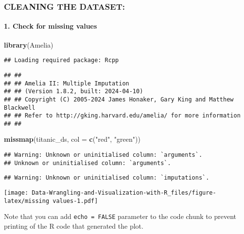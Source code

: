\documentclass[
]{article}
\newenvironment{Shaded}{\begin{snugshade}}{\end{snugshade}}
\newcommand{\AttributeTok}[1]{\textcolor[rgb]{0.13,0.29,0.53}{#1}}
\newcommand{\FunctionTok}[1]{\textcolor[rgb]{0.13,0.29,0.53}{\textbf{#1}}}
\newcommand{\NormalTok}[1]{#1}
\newcommand{\StringTok}[1]{\textcolor[rgb]{0.31,0.60,0.02}{#1}}
\begin{document}
\subsubsection{CLEANING THE DATASET:}\label{cleaning-the-dataset}

\paragraph{1. Check for missing values}\label{check-for-missing-values}

\begin{Shaded}
\begin{Highlighting}[]
\FunctionTok{library}\NormalTok{(Amelia)}
\end{Highlighting}
\end{Shaded}

\begin{verbatim}
## Loading required package: Rcpp
\end{verbatim}

\begin{verbatim}
## ## 
## ## Amelia II: Multiple Imputation
## ## (Version 1.8.2, built: 2024-04-10)
## ## Copyright (C) 2005-2024 James Honaker, Gary King and Matthew Blackwell
## ## Refer to http://gking.harvard.edu/amelia/ for more information
## ##
\end{verbatim}

\begin{Shaded}
\begin{Highlighting}[]
\FunctionTok{missmap}\NormalTok{(titanic\_ds, }\AttributeTok{col =} \FunctionTok{c}\NormalTok{(}\StringTok{"red"}\NormalTok{, }\StringTok{"green"}\NormalTok{))}
\end{Highlighting}
\end{Shaded}

\begin{verbatim}
## Warning: Unknown or uninitialised column: `arguments`.
## Unknown or uninitialised column: `arguments`.
\end{verbatim}

\begin{verbatim}
## Warning: Unknown or uninitialised column: `imputations`.
\end{verbatim}

\texttt{[image: Data-Wrangling-and-Visualization-with-R\_files/figure-latex/missing values-1.pdf]}

Note that you can add \texttt{echo\ =\ FALSE} parameter to the code
chunk to prevent printing of the R code that generated the plot.
\end{document}
